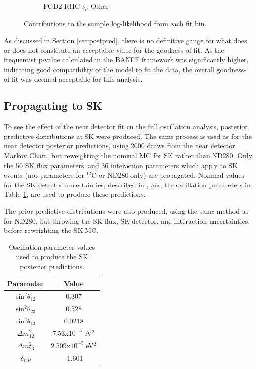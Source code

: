 \begin{figure}
\begin{subfigure}{.32\textwidth}
  \caption{FGD2 RHC $\nu_{\mu}$ Other}
  \label{fig:llhcont_FGD2_NuMuBkg_CCOther_in_AntiNu_Mode}
\end{subfigure}
\caption{Contributions to the sample log-likelihood from each fit bin.}
\label{fig:llhconts}
\end{figure}

As discussed in Section \ref{sec:postpred}, there is no definitive gauge for what does or does not constitute an acceptable value for the goodness of fit. As the frequentist p-value calculated in the BANFF framework was significantly higher\cite{}, indicating good compatibility of the model to fit the data, the overall goodness-of-fit was deemed acceptable for this analysis.

\subsection{Propagating to SK}

To see the effect of the near detector fit on the full oscillation analysis, posterior predictive distributions at SK were produced. The same process is used as for the near detector posterior predictions, using 2000 draws from the near detector Markov Chain, but reweighting the nominal MC for SK rather than ND280. Only the 50 SK flux parameters, and 36 interaction parameters which apply to SK events (not parameters for $^{12}$C or ND280 only) are propagated. Nominal values for the SK detector uncertainties, described in \cite{tn399}, and the oscillation parameters in Table \ref{tab:oscpar}, are used to produce these predictions.

The prior predictive distributions were also produced, using the same method as for ND280, but throwing the SK flux, SK detector, and interaction uncertainties, before reweighting the SK MC.

\begin{center}
\begin{table}
\center
\begin{tabular}{c||c}
\hline \hline
\textbf{Parameter} & \textbf{Value} \\
\hline\hline
sin$^2 \theta_{12}$ & 0.307 \\ 
sin$^2 \theta_{23}$ & 0.528 \\
sin$^2 \theta_{13}$ & 0.0218 \\
$\Delta m^2_{12}$ & 7.53x$10^{-5}$ eV$^2$\\ 
$\Delta m^2_{23}$ & 2.509x$10^{-5}$ eV$^2$ \\ 
$\delta_{CP}$ & -1.601 \\ 
\hline \hline
\end{tabular}
\caption{Oscillation parameter values used to produce the SK posterior predictions.}
\label{tab:oscpar}
\end{table}
\end{center}


